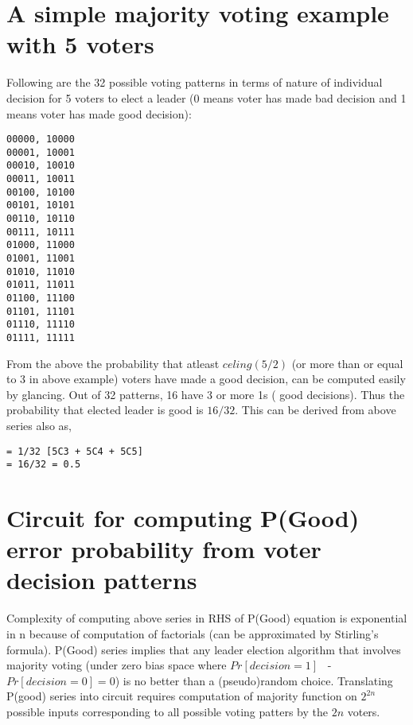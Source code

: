 \documentclass[11pt,onecolumn]{article}
\begin{document}
\section{A simple majority voting example with 5 voters}
Following are the 32 possible voting patterns in terms of nature of individual decision for 5 voters
to elect a leader (0 means voter has made bad decision and 1 means voter has made good decision):
\begin{verbatim}
00000, 10000
00001, 10001
00010, 10010
00011, 10011
00100, 10100
00101, 10101
00110, 10110
00111, 10111
01000, 11000
01001, 11001
01010, 11010
01011, 11011
01100, 11100
01101, 11101
01110, 11110
01111, 11111
\end{verbatim}
From the above the probability that atleast $celing(5/2)$ (or more than or equal to 3 in above
example) voters have made a good decision, can be computed easily by glancing. Out of 32
patterns, 16 have 3 or more 1s ( good decisions). Thus the probability that elected leader is good
is $16/32$. This can be derived from above series also as,
\begin{verbatim}
= 1/32 [5C3 + 5C4 + 5C5]
= 16/32 = 0.5
\end{verbatim}

\section{Circuit for computing P(Good) error probability from voter decision patterns}
Complexity of computing above series in RHS of P(Good) equation is exponential in n because of
computation of factorials (can be approximated by Stirling's formula). P(Good) series implies
that any leader election algorithm that involves majority voting (under zero bias space where
$Pr[decision=1]$ \ - $Pr[decision=0] = 0$) is no better than a (pseudo)random choice.
Translating P(good) series into circuit requires computation of majority function on $2^{2n}$
possible inputs corresponding to all possible voting patters by the $2n$ voters.
\end{document}
